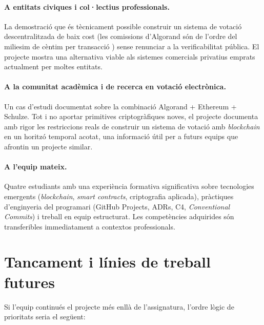 \paragraph{A entitats civiques i col·lectius professionals.} La
demostració que és tècnicament possible construir un sistema de
votació descentralitzada de baix cost (les comissions d'Algorand són
de l'ordre del miliesim de cèntim per transacció
\cite{chen2017algorand}) sense renunciar a la verificabilitat
pública. El projecte mostra una alternativa viable als sistemes
comercials privatius emprats actualment per moltes entitats.

\paragraph{A la comunitat acadèmica i de recerca en votació
electrònica.} Un cas d'estudi documentat sobre la combinació
Algorand + Ethereum + Schulze. Tot i no aportar primitives
criptogràfiques noves, el projecte documenta amb rigor les
restriccions reals de construir un sistema de votació amb
\emph{blockchain} en un horitzó temporal acotat, una informació útil
per a futurs equips que afrontin un projecte similar.

\paragraph{A l'equip mateix.} Quatre estudiants amb una experiència
formativa significativa sobre tecnologies emergents (\emph{blockchain},
\emph{smart contracts}, criptografia aplicada), pràctiques
d'enginyeria del programari (GitHub Projects, \aclp{ADR}, C4,
\emph{Conventional Commits}) i treball en equip estructurat. Les
competències adquirides són transferibles immediatament a contextos
professionals.

\section{Tancament i línies de treball futures}
\label{sec:tancament}

Si l'equip continués el projecte més enllà de l'assignatura,
l'ordre lògic de prioritats seria el següent:

